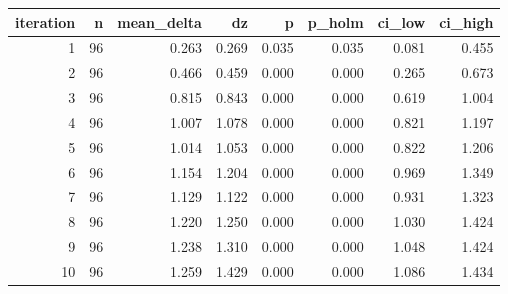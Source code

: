 \begin{tabular}{rrrrrrrr}
\toprule
iteration & n & mean\_delta & dz & p & p\_holm & ci\_low & ci\_high \\
\midrule
1 & 96 & 0.263 & 0.269 & 0.035 & 0.035 & 0.081 & 0.455 \\
2 & 96 & 0.466 & 0.459 & 0.000 & 0.000 & 0.265 & 0.673 \\
3 & 96 & 0.815 & 0.843 & 0.000 & 0.000 & 0.619 & 1.004 \\
4 & 96 & 1.007 & 1.078 & 0.000 & 0.000 & 0.821 & 1.197 \\
5 & 96 & 1.014 & 1.053 & 0.000 & 0.000 & 0.822 & 1.206 \\
6 & 96 & 1.154 & 1.204 & 0.000 & 0.000 & 0.969 & 1.349 \\
7 & 96 & 1.129 & 1.122 & 0.000 & 0.000 & 0.931 & 1.323 \\
8 & 96 & 1.220 & 1.250 & 0.000 & 0.000 & 1.030 & 1.424 \\
9 & 96 & 1.238 & 1.310 & 0.000 & 0.000 & 1.048 & 1.424 \\
10 & 96 & 1.259 & 1.429 & 0.000 & 0.000 & 1.086 & 1.434 \\
\bottomrule
\end{tabular}
